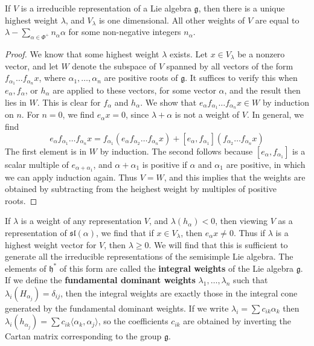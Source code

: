 \begin{lemma}
    If $V$ is a irreducible representation of a Lie algebra $\mathfrak{g}$, then there is a unique highest weight $\lambda$, and $V_\lambda$ is one dimensional. All other weights of $V$ are equal to $\lambda - \sum_{\alpha \in \Phi^+} n_\alpha \alpha$ for some non-negative integers $n_\alpha$.
\end{lemma}
\begin{proof}
    We know that some highest weight $\lambda$ exists. Let $x \in V_\lambda$ be a nonzero vector, and let $W$ denote the subspace of $V$ spanned by all vectors of the form $f_{\alpha_1} \dots f_{\alpha_n} x$, where $\alpha_1, \dots, \alpha_n$ are positive roots of $\mathfrak{g}$. It suffices to verify this when $e_\alpha, f_\alpha$, or $h_\alpha$ are applied to these vectors, for some vector $\alpha$, and the result then lies in $W$. This is clear for $f_\alpha$ and $h_\alpha$. We show that $e_\alpha f_{\alpha_1} \dots f_{\alpha_n} x \in W$ by induction on $n$. For $n = 0$, we find $e_\alpha x = 0$, since $\lambda + \alpha$ is not a weight of $V$. In general, we find
    \[ e_\alpha f_{\alpha_1} \dots f_{\alpha_n} x = f_{\alpha_1} (e_\alpha f_{\alpha_2} \dots f_{\alpha_n} x) + [e_\alpha, f_{\alpha_1}](f_{\alpha_2} \dots f_{\alpha_n} x) \]
    The first element is in $W$ by induction. The second follows because $[e_\alpha, f_{\alpha_1}]$ is a scalar multiple of $e_{\alpha + \alpha_1}$, and $\alpha + \alpha_1$ is positive if $\alpha$ and $\alpha_1$ are positive, in which we can apply induction again. Thus $V = W$, and this implies that the weights are obtained by subtracting from the heighest weight by multiples of positive roots.
\end{proof}

If $\lambda$ is a weight of any representation $V$, and $\lambda(h_\alpha) < 0$, then viewing $V$ as a representation of $\mathfrak{sl}(\alpha)$, we find that if $x \in V_\lambda$, then $e_\alpha x \neq 0$. Thus if $\lambda$ is a highest weight vector for $V$, then $\lambda \geq 0$. We will find that this is sufficient to generate all the irreducible representations of the semisimple Lie algebra. The elements of $\mathfrak{h}^*$ of this form are called the {\bf integral weights} of the Lie algebra $\mathfrak{g}$. If we define the {\bf fundamental dominant weights} $\lambda_1, \dots, \lambda_n$ such that $\lambda_i(H_{\alpha_j}) = \delta_{ij}$, then the integral weights are exactly those in the integral cone generated by the fundamental dominant weights. If we write $\lambda_i = \sum c_{ik} \alpha_k$ then $\lambda_i(h_{\alpha_j}) = \sum c_{ik} \langle \alpha_k, \alpha_j \rangle$, so the coefficients $c_{ik}$ are obtained by inverting the Cartan matrix corresponding to the group $\mathfrak{g}$.

